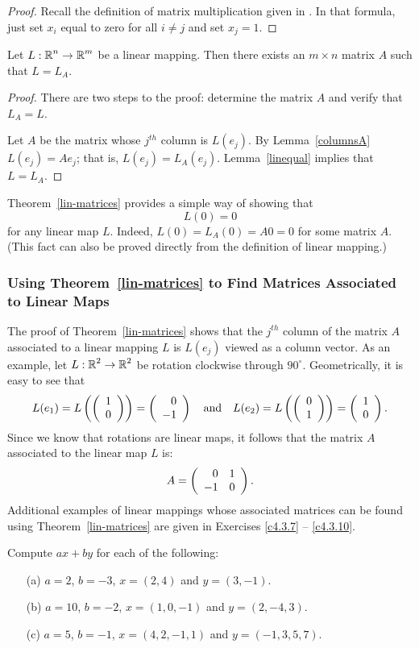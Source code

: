 \documentclass{ximera}
\begin{document}
\begin{proof}  Recall the definition of matrix multiplication given in .
In that formula, just set $x_i$ equal to zero for all $i\neq j$ and set
$x_j=1$. \end{proof}

\begin{theorem}  \label{lin-matrices}
Let $L:\mbox{$\Bbb{R}$}^n\to\mbox{$\Bbb{R}$}^m$ be a linear mapping.
Then there exists an $m\times n$ matrix $A$ such that $L=L_A$.
\end{theorem}

\begin{proof}
There are two steps to the proof: determine the matrix $A$ and
verify that $L_A=L$.

Let $A$ be the matrix whose $j^{th}$ column is $L(e_j)$.  By
Lemma~\ref{columnsA} $L(e_j) = Ae_j$; that is, $L(e_j) = L_A(e_j)$.
Lemma~\ref{linequal} implies that $L=L_A$.  \end{proof}

Theorem~\ref{lin-matrices} provides a simple way of showing that
\[
L(0) = 0
\]
for any linear map $L$.  Indeed, $L(0)=L_A(0)=A0=0$ for some matrix $A$.  
(This fact can also be proved directly from the definition of linear mapping.)

\subsubsection*{Using Theorem~\protect\ref{lin-matrices} to Find Matrices
Associated to Linear Maps}

The proof of Theorem~\ref{lin-matrices} shows that the $j^{th}$ column of the
matrix $A$ associated to a linear mapping $L$ is $L(e_j)$ viewed as a column
vector.  As an example, let $L:\mbox{$\Bbb{R}$}^2\to\mbox{$\Bbb{R}$}^2$ be rotation clockwise through
$90^\circ$.  Geometrically, it is easy to see that
\[
L(e_1) = L\left(\left(\begin{array}{r} 1 \\ 0\end{array}\right)\right) = \left(\begin{array}{r} 0 \\ -1\end{array}\right) \quad\mbox{and}\quad
L(e_2) = L\left(\left(\begin{array}{r} 0 \\ 1\end{array}\right)\right) = \left(\begin{array}{r} 1 \\ 0\end{array}\right).
\]
Since we know that rotations are linear maps, it follows that the matrix
$A$ associated to the linear map $L$ is:
\[
A = \left(\begin{array}{rr} 0 & 1\\ -1 &0\end{array}\right).
\]
Additional examples of linear mappings whose associated matrices can be found
using Theorem~\ref{lin-matrices} are given in Exercises \ref{c4.3.7} --
\ref{c4.3.10}.



\EXER

\TEXER

\begin{exercise} \label{c4.3.1}
Compute $ax+by$ for each of the following:
\begin{itemize}
\item[(a)] $a=2$, $b=-3$, $x=(2,4)$ and $y=(3,-1)$.
\item[(b)] $a=10$, $b=-2$, $x=(1,0,-1)$ and $y=(2,-4,3)$.
\item[(c)] $a=5$, $b=-1$, $x=(4,2,-1,1)$ and $y=(-1,3,5,7)$.
\end{itemize}
\end{exercise}
\end{document}
